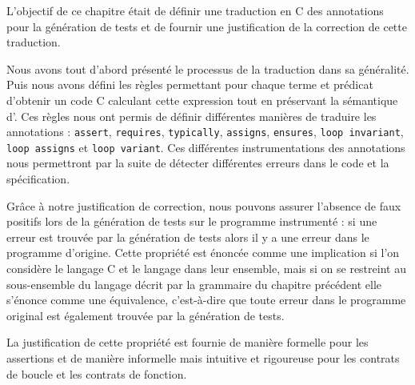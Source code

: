 L'objectif de ce chapitre était de définir une traduction en C des annotations
\eacsl pour la génération de tests et de fournir une justification de la
correction de cette traduction.

Nous avons tout d'abord présenté le processus de la traduction dans sa
généralité.
Puis nous avons défini les règles permettant pour chaque terme et prédicat
\eacsl d'obtenir un code C calculant cette expression tout en préservant la
sémantique d'\eacsl.
Ces règles nous ont permis de définir différentes manières de traduire les
annotations \eacsl : \lstinline'assert', \lstinline'requires',
\lstinline'typically', \lstinline'assigns', \lstinline'ensures',
\lstinline'loop invariant', \lstinline'loop assigns' et
\lstinline'loop variant'.
Ces différentes instrumentations des annotations nous permettront par la suite
de détecter différentes erreurs dans le code et la spécification.

Grâce à notre justification de correction, nous pouvons assurer l'absence de
faux positifs lors de la génération de tests sur le programme instrumenté : si
une erreur est trouvée par la génération de tests alors il y a une erreur dans
le programme d'origine.
Cette propriété est énoncée comme une implication si l'on considère le langage
C et le langage \eacsl dans leur ensemble, mais si on se restreint au
sous-ensemble du langage décrit par la grammaire du chapitre précédent elle
s'énonce comme une équivalence, c'est-à-dire que toute erreur dans le programme
original est également trouvée par la génération de tests.

La justification de cette propriété est fournie de manière formelle pour les
assertions et de manière informelle mais intuitive et rigoureuse pour les
contrats de boucle et les contrats de fonction.
